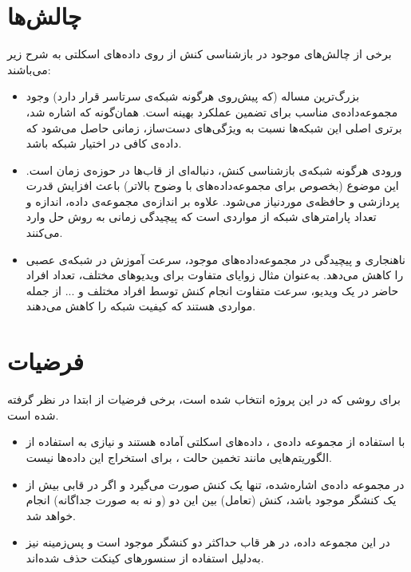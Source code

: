 
\section{چالش‌ها}
برخی از چالش‌های موجود در بازشناسی کنش از روی داده‌های اسکلتی به شرح زیر می‌باشند:
\begin{itemize}
\item بزرگ‌ترین مساله (که پیش‌روی هرگونه شبکه‌ی سرتاسر قرار دارد) وجود مجموعه‌داده‌ی مناسب برای تضمین عملکرد بهینه است. همان‌گونه که اشاره شد، برتری اصلی این شبکه‌ها نسبت به ویژگی‌های دست‌ساز، زمانی حاصل می‌شود که داده‌ی کافی در اختیار شبکه باشد. 
\item ورودی هرگونه شبکه‌ی بازشناسی کنش، دنباله‌ای از قاب‌ها در حوزه‌ی زمان است. این موضوع (بخصوص برای مجموعه‌داده‌های با وضوح بالاتر) باعث افزایش قدرت پردازشی و حافظه‌ی موردنیاز می‌شود. علاوه بر اندازه‌ی مجموعه‌ی داده، اندازه و تعداد پارامترهای شبکه از مواردی است که پیچیدگی زمانی به روش حل وارد می‌کنند.
\item ناهنجاری و پیچیدگی در مجموعه‌داده‌های موجود، سرعت آموزش در شبکه‌ی عصبی را کاهش می‌دهد. به‌عنوان مثال زوایای متفاوت برای ویدیوهای مختلف، تعداد افراد حاضر در یک ویدیو، سرعت متفاوت انجام کنش توسط افراد مختلف و ... از جمله مواردی هستند که کیفیت شبکه را کاهش می‌دهند.

\end{itemize}


\section{فرضیات}
برای روشی که در این پروژه انتخاب شده است، برخی فرضیات از ابتدا در نظر گرفته شده است.
\begin{itemize}
\item با استفاده از مجموعه ‌داده‌ی \cite{NTU_paper}، داده‌های اسکلتی آماده هستند و نیازی به استفاده از الگوریتم‌هایی مانند تخمین حالت ، برای استخراج این داده‌ها نیست.\cite{NTU_paper}\cite{st-gcn}
\item در مجموعه ‌داده‌ی اشاره‌شده، تنها یک کنش صورت می‌گیرد و اگر در قابی بیش از یک کنشگر موجود باشد، کنش (تعامل) بین این دو (و نه به صورت جداگانه) انجام خواهد شد. 
\item در این مجموعه داده، در هر قاب حداکثر دو کنشگر موجود است و پس‌زمینه نیز به‌دلیل استفاده از سنسورهای کینکت حذف شده‌اند.
\end{itemize}





